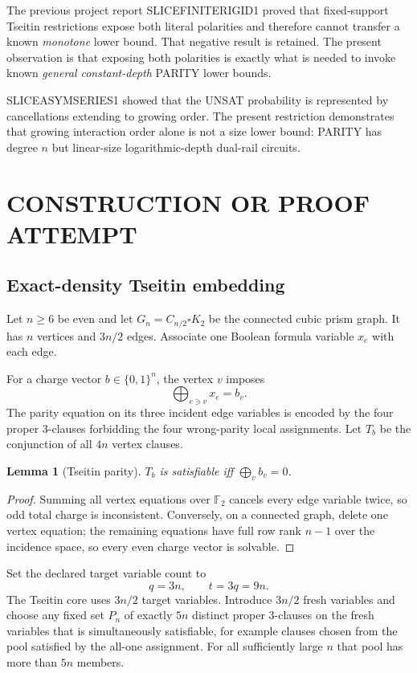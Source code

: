 \documentclass[11pt]{article}
\newtheorem{lemma}[theorem]{Lemma}
\begin{document}
The previous project report SLICEFINITERIGID1 proved that fixed-support Tseitin restrictions expose both literal polarities and therefore cannot transfer a known \emph{monotone} lower bound. That negative result is retained. The present observation is that exposing both polarities is exactly what is needed to invoke known \emph{general constant-depth} PARITY lower bounds.

SLICEASYMSERIES1 showed that the UNSAT probability is represented by cancellations extending to growing order. The present restriction demonstrates that growing interaction order alone is not a size lower bound: PARITY has degree $n$ but linear-size logarithmic-depth dual-rail circuits.

\section{CONSTRUCTION OR PROOF ATTEMPT}
\subsection{Exact-density Tseitin embedding}
Let $n\ge6$ be even and let $G_n=C_{n/2}\square K_2$ be the connected cubic prism graph. It has $n$ vertices and $3n/2$ edges. Associate one Boolean formula variable $x_e$ with each edge.

For a charge vector $b\in\{0,1\}^n$, the vertex $v$ imposes
\[\bigoplus_{e\ni v}x_e=b_v.\]
The parity equation on its three incident edge variables is encoded by the four proper 3-clauses forbidding the four wrong-parity local assignments. Let $T_b$ be the conjunction of all $4n$ vertex clauses.

\begin{lemma}[Tseitin parity]
$T_b$ is satisfiable iff $\bigoplus_v b_v=0$.
\end{lemma}
\begin{proof}
Summing all vertex equations over $\mathbb F_2$ cancels every edge variable twice, so odd total charge is inconsistent. Conversely, on a connected graph, delete one vertex equation; the remaining equations have full row rank $n-1$ over the incidence space, so every even charge vector is solvable.
\end{proof}

Set the declared target variable count to
\[q=3n,\qquad t=3q=9n.\]
The Tseitin core uses $3n/2$ target variables. Introduce $3n/2$ fresh variables and choose any fixed set $P_n$ of exactly $5n$ distinct proper 3-clauses on the fresh variables that is simultaneously satisfiable, for example clauses chosen from the pool satisfied by the all-one assignment. For all sufficiently large $n$ that pool has more than $5n$ members.
\end{document}
